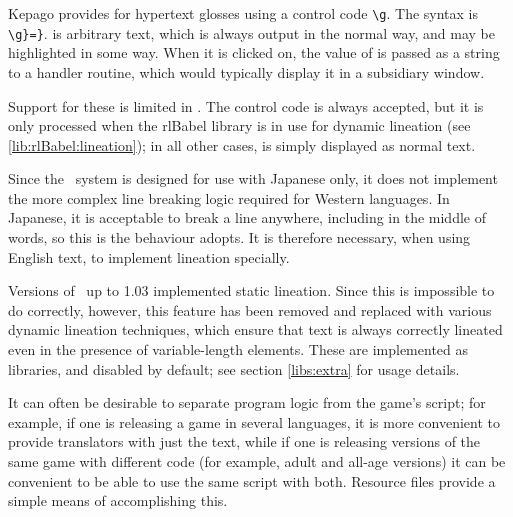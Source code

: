 
    Kepago provides for hypertext glosses using a control code \lstinline|\g|.
    The syntax is
    \lstinline|\g|\rawlbrace{}\lstinline|}=|\rawlbrace{}\lstinline|}|.
     is arbitrary text, which is always output in the normal way,
    and may be highlighted in some way.  When it is clicked on, the value of
     is passed as a string to a handler routine, which would
    typically display it in a subsidiary window.

    Support for these is limited in \compiler.  The control code is always
    accepted, but it is only processed when the rlBabel library is in use for
    dynamic lineation (see \ref{lib:rlBabel:lineation}); in all other cases,
     is simply displayed as normal text.

  \label{sec:lineation}

    Since the \reallive\ system is designed for use with Japanese only, it does
    not implement the more complex line breaking logic required for Western
    languages.  In Japanese, it is acceptable to break a line anywhere,
    including in the middle of words, so this is the behaviour \reallive{}
    adopts.  It is therefore necessary, when using English text, to implement
    lineation specially.

    Versions of \package\ up to 1.03 implemented static lineation.  Since this 
    is impossible to do correctly, however, this feature has been removed and 
    replaced with various dynamic lineation techniques, which ensure that text 
    is always correctly lineated even in the presence of variable-length 
    elements.  These are implemented as libraries, and disabled by default; see 
    section \ref{libs:extra} for usage details.

\label{sec:resources}

  It can often be desirable to separate program logic from the game's script;
  for example, if one is releasing a game in several languages, it is more
  convenient to provide translators with just the text, while if one is
  releasing versions of the same game with different code (for example, adult
  and all-age versions) it can be convenient to be able to use the same script
  with both.  Resource files provide a simple means of accomplishing this.

